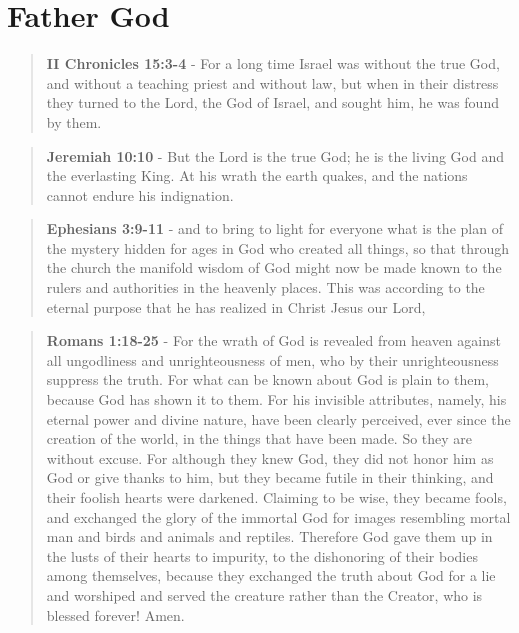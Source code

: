 \documentclass[11pt]{article}
\begin{document}
\section{Father God}
\label{sec:org640e041}
\begin{quote}
\textbf{II Chronicles 15:3-4} - For a long time Israel was without the true God, and without a teaching priest and without law, but when in their distress they turned to the Lord, the God of Israel, and sought him, he was found by them.
\end{quote}

\begin{quote}
\textbf{Jeremiah 10:10} - But the Lord is the true God; he is the living God and the everlasting King. At his wrath the earth quakes, and the nations cannot endure his indignation.
\end{quote}

\begin{quote}
\textbf{Ephesians 3:9-11} - and to bring to light for everyone what is the plan of the mystery hidden for ages in God who created all things, so that through the church the manifold wisdom of God might now be made known to the rulers and authorities in the heavenly places. This was according to the eternal purpose that he has realized in Christ Jesus our Lord,
\end{quote}

\begin{quote}
\textbf{Romans 1:18-25} - For the wrath of God is revealed from heaven against all ungodliness and unrighteousness of men, who by their unrighteousness suppress the truth. For what can be known about God is plain to them, because God has shown it to them. For his invisible attributes, namely, his eternal power and divine nature, have been clearly perceived, ever since the creation of the world, in the things that have been made. So they are without excuse. For although they knew God, they did not honor him as God or give thanks to him, but they became futile in their thinking, and their foolish hearts were darkened. Claiming to be wise, they became fools, and exchanged the glory of the immortal God for images resembling mortal man and birds and animals and reptiles. Therefore God gave them up in the lusts of their hearts to impurity, to the dishonoring of their bodies among themselves, because they exchanged the truth about God for a lie and worshiped and served the creature rather than the Creator, who is blessed forever! Amen.
\end{quote}
\end{document}
